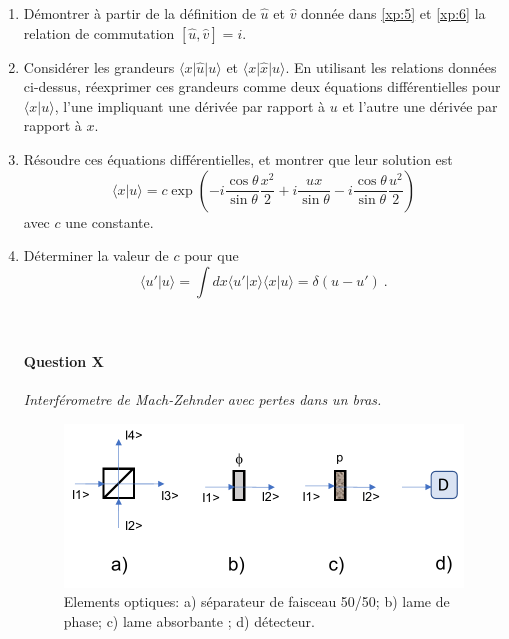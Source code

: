 \begin{enumerate}


\item 
Démontrer  à partir de la définition de $\hat u$ et $\hat v$ donnée dans  \eqref{xp:5} et \eqref{xp:6} la relation de commutation  $[\hat u, \hat v ] = i$.

\item
Considérer les grandeurs $\langle x \vert \hat u \vert u\rangle $ et $\langle x \vert \hat x \vert u\rangle$. En utilisant les relations données ci-dessus, réexprimer ces grandeurs comme deux équations différentielles pour $\langle x \vert u\rangle$, l'une impliquant une dérivée par rapport à $u$ et l'autre une dérivée par rapport à $x$.

\item
Résoudre ces équations différentielles, et montrer que leur solution est
\begin{equation}
\langle x \vert u \rangle =  c  \exp \left( - i \frac{\cos \theta}{\sin \theta}\frac{x^2}{2} + i \frac{u x}{\sin \theta} - i \frac{\cos \theta}{\sin \theta}\frac{u^2}{2} \right)
\end{equation}
avec $c$ une constante.

\item
Déterminer la valeur de $c$ pour que 
\begin{equation}
\langle u' \vert u \rangle = \int dx \langle u' \vert x \rangle \langle x \vert u \rangle = \delta (u - u') \ .
\end{equation}


\newpage
\
\newpage

\paragraph{Question X} \textit{Interférometre de Mach-Zehnder avec pertes dans un bras.} \\

\begin{figure}[h!]
\begin{center}
\includegraphics[width=0.9\columnwidth]{Pictures/Fig-Optique.pdf} 
\end{center}
\caption{Elements optiques: a) séparateur de faisceau 50/50; b) lame de phase; c) lame absorbante ; d) détecteur.}
\label{fig:Optique}
\end{figure}


\end{enumerate}
